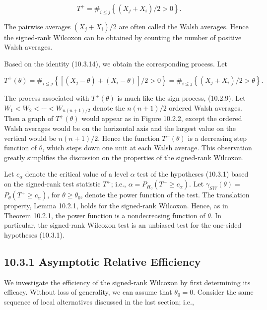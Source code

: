 \begin{equation*}
T^{+}=\#_{i \leq j}\left\{\left(X_{j}+X_{i}\right) / 2>0\right\} . \tag{10.3.14}
\end{equation*}


The pairwise averages $\left(X_{j}+X_{i}\right) / 2$ are often called the Walsh averages. Hence the signed-rank Wilcoxon can be obtained by counting the number of positive Walsh averages.

Based on the identity (10.3.14), we obtain the corresponding process. Let


\begin{equation*}
T^{+}(\theta)=\#_{i \leq j}\left\{\left[\left(X_{j}-\theta\right)+\left(X_{i}-\theta\right)\right] / 2>0\right\}=\#_{i \leq j}\left\{\left(X_{j}+X_{i}\right) / 2>\theta\right\} . \tag{10.3.15}
\end{equation*}


The process associated with $T^{+}(\theta)$ is much like the sign process, (10.2.9). Let $W_{1}<W_{2}<\cdots<W_{n(n+1) / 2}$ denote the $n(n+1) / 2$ ordered Walsh averages. Then a graph of $T^{+}(\theta)$ would appear as in Figure 10.2.2, except the ordered Walsh averages would be on the horizontal axis and the largest value on the vertical would be $n(n+1) / 2$. Hence the function $T^{+}(\theta)$ is a decreasing step function of $\theta$, which steps down one unit at each Walsh average. This observation greatly simplifies the discussion on the properties of the signed-rank Wilcoxon.

Let $c_{\alpha}$ denote the critical value of a level $\alpha$ test of the hypotheses (10.3.1) based on the signed-rank test statistic $T^{+}$; i.e., $\alpha=P_{H_{0}}\left(T^{+} \geq c_{\alpha}\right)$. Let $\gamma_{S W}(\theta)=$ $P_{\theta}\left(T^{+} \geq c_{\alpha}\right)$, for $\theta \geq \theta_{0}$, denote the power function of the test. The translation property, Lemma 10.2.1, holds for the signed-rank Wilcoxon. Hence, as in Theorem 10.2.1, the power function is a nondecreasing function of $\theta$. In particular, the signed-rank Wilcoxon test is an unbiased test for the one-sided hypotheses (10.3.1).

\subsection*{10.3.1 Asymptotic Relative Efficiency}
We investigate the efficiency of the signed-rank Wilcoxon by first determining its efficacy. Without loss of generality, we can assume that $\theta_{0}=0$. Consider the same sequence of local alternatives discussed in the last section; i.e.,


